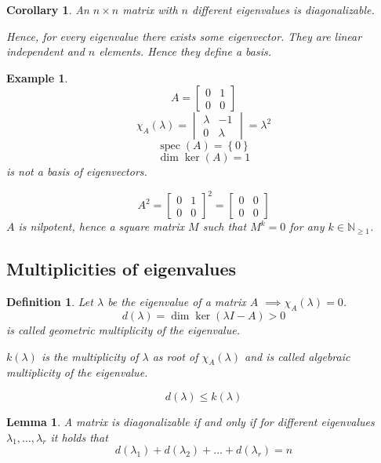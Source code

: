 \documentclass{article}
\newcounter{lecref}[section]
\numberwithin{lecref}{section}
\newtheorem{example}[lecref]{Example}
\newtheorem{definition}[lecref]{Definition}
\newtheorem{lemma}[lecref]{Lemma}
\newtheorem{corollary}[lecref]{Corollary}
\newcommand{\set}[1]{\left\{#1\right\}}
\begin{document}
\begin{corollary} %
  An $n\times n$ matrix with $n$ different eigenvalues is diagonalizable.

  Hence, for every eigenvalue there exists some eigenvector. They are linear independent and $n$ elements.
  Hence they define a basis.
\end{corollary}

\begin{example} %
  \[ A = \begin{bmatrix} 0 & 1 \\ 0 & 0 \end{bmatrix} \]
  \[ \chi_A(\lambda) = \begin{vmatrix} \lambda & -1 \\ 0 & \lambda \end{vmatrix} = \lambda^2 \]
  \[ \operatorname{spec}(A) = \set{0} \]
  \[ \dim\ker(A) = 1 \]
  is not a basis of eigenvectors.

  \[ A^2 = \begin{bmatrix} 0 & 1 \\ 0 & 0 \end{bmatrix}^2 = \begin{bmatrix} 0 & 0 \\ 0 & 0 \end{bmatrix} \]
  $A$ is nilpotent, hence a square matrix $M$ such that $M^k = 0$ for any $k \in \mathbb N_{\geq1}$.
\end{example}

\subsection{Multiplicities of eigenvalues}

\begin{definition} %
  Let $\lambda$ be the eigenvalue of a matrix $A$ $\implies \chi_A(\lambda) = 0$.
  \[ d(\lambda) = \dim\ker(\lambda I - A) > 0 \]
  is called \emph{geometric multiplicity of the eigenvalue}.

  $k(\lambda)$ is the multiplicity of $\lambda$ as root of $\chi_A(\lambda)$
  and is called \emph{algebraic multiplicity of the eigenvalue}.

  \[ d(\lambda) \leq k(\lambda) \]
\end{definition}

\begin{lemma} %
  A matrix is diagonalizable if and only if for different eigenvalues $\lambda_1, \dots, \lambda_r$ it holds that
  \[ d(\lambda_1) + d(\lambda_2) + \dots + d(\lambda_r) = n \]
\end{lemma}
\end{document}
